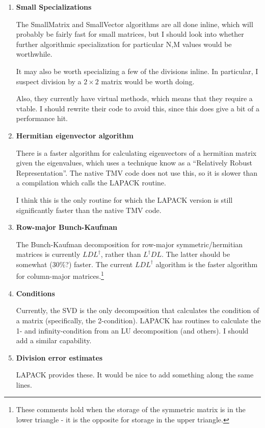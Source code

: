 \documentclass[twoside,letterpaper,11pt]{article}
\begin{document}
\begin{enumerate}
\item
\textbf{Small Specializations}

The SmallMatrix and SmallVector algorithms are all done inline, which will
probably be fairly fast for small matrices, but I should look into
whether further algorithmic specialization for particular N,M values
would be worthwhile.  

It may also be worth specializing a few of the divisions inline.  In particular,
I suspect division by a $2 \times 2$ matrix would be worth doing.

Also, they currently have virtual methods, which
means that they require a vtable.  I should rewrite their code to avoid this,
since this does give a bit of a performance hit.

\item
\textbf{Hermitian eigenvector algorithm}

There is a faster algorithm for calculating eigenvectors of a hermitian
matrix given the eigenvalues, which uses a technique know as
a ``Relatively Robust Representation''.  The native TMV
code does not use this, so it is slower than a compilation which calls
the LAPACK routine.

I think this is the only routine for which the LAPACK version is still significantly
faster than the native TMV code.

\item
\textbf{Row-major Bunch-Kaufman}

The Bunch-Kaufman decomposition for row-major symmetric/hermitian
matrices is currently $L D L^\dagger$, rather than $L^\dagger D L$.  
The latter should be somewhat (30\%?) faster.  The current $L D L^\dagger$
algorithm is the faster algorithm for column-major matrices.\footnote{
These comments hold when the storage of the symmetric matrix is in the 
lower triangle - it is the opposite for storage in the upper triangle.}

\item
\textbf{Conditions}

Currently, the SVD is the only decomposition that calculates the condition
of a matrix (specifically, the 2-condition).  
LAPACK has routines to calculate the 1- and infinity-condition
from an LU decomposition (and others).  I should add a similar capability.

\item
\textbf{Division error estimates}

LAPACK provides these.  It would be nice to add something along the same lines.


\end{enumerate}
\end{document}
